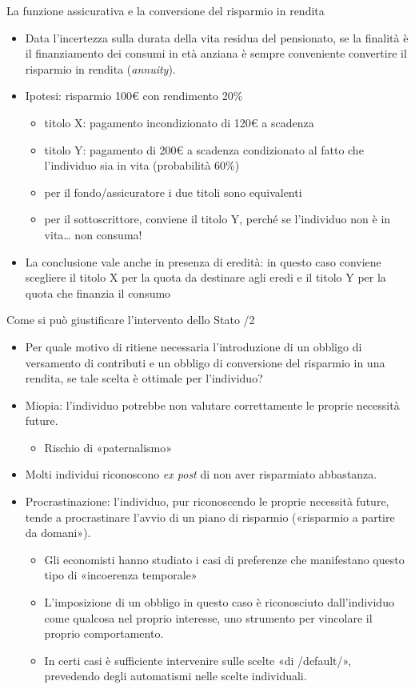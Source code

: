 \documentclass[11pt]{beamer}
\begin{document}
\begin{frame}{La funzione assicurativa e la conversione del risparmio in rendita}
\begin{itemize}
\item Data l'incertezza sulla durata della vita residua del pensionato, se la
finalità è il finanziamento dei consumi in età anziana è \alert{sempre}
conveniente convertire il risparmio in rendita (\emph{annuity}).
\item Ipotesi: risparmio 100€ con rendimento 20\%
\begin{itemize}
\item titolo X: pagamento incondizionato di 120€ a scadenza
\item titolo Y: pagamento di 200€ a scadenza condizionato al fatto che
l'individuo sia in vita (probabilità 60\%)
\item per il fondo/assicuratore i due titoli sono equivalenti
\item per il sottoscrittore, conviene il titolo Y, perché se l'individuo non è
in vita\ldots{} non consuma!
\end{itemize}
\item La conclusione vale anche in presenza di eredità: in questo caso conviene
scegliere il titolo X per la quota da destinare agli eredi e il titolo Y per
la quota che finanzia il consumo
\end{itemize}
\end{frame}

\begin{frame}{Come si può giustificare l'intervento dello Stato /2}
\begin{itemize}
\item Per quale motivo di ritiene necessaria l'introduzione di un obbligo di
versamento di contributi e un obbligo di conversione del risparmio in una
rendita, se tale scelta è ottimale per l'individuo?
\item \alert{Miopia}: l'individuo potrebbe non valutare correttamente le proprie
necessità future.
\begin{itemize}
\item Rischio di «paternalismo»
\end{itemize}
\item Molti individui riconoscono \emph{ex post} di non aver risparmiato abbastanza.
\item \alert{Procrastinazione}: l'individuo, pur riconoscendo le proprie necessità
future, tende a procrastinare l'avvio di un piano di risparmio («risparmio a
partire da domani»).
\begin{itemize}
\item Gli economisti hanno studiato i casi di preferenze che manifestano questo
tipo di «incoerenza temporale»
\item L'imposizione di un obbligo in questo caso è riconosciuto dall'individuo
come qualcosa nel proprio interesse, uno strumento per vincolare il
proprio comportamento.
\item In certi casi è sufficiente intervenire sulle scelte «di /default/»,
prevedendo degli automatismi nelle scelte individuali.
\end{itemize}
\end{itemize}
\end{frame}
\end{document}
